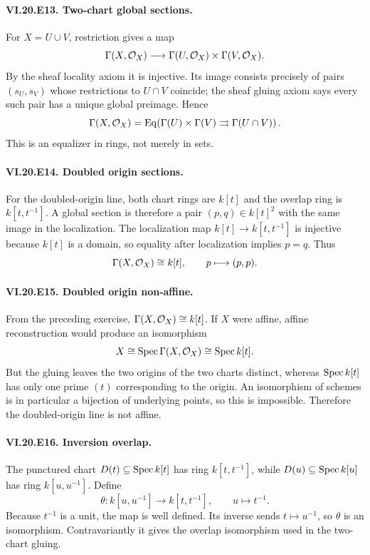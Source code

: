 \paragraph{VI.20.E13. Two-chart global sections.}
\begin{solution}
For $X=U\cup V$, restriction gives a map
\[
\Gamma(X,\mathcal O_X)\longrightarrow \Gamma(U,\mathcal O_X)\times\Gamma(V,\mathcal O_X).
\]
By the sheaf locality axiom it is injective.  Its image consists precisely of pairs $(s_U,s_V)$ whose restrictions to $U\cap V$ coincide; the sheaf gluing axiom says every such pair has a unique global preimage.  Hence
\[
\Gamma(X,\mathcal O_X)
=\operatorname{Eq}\!\left(
\Gamma(U)\times\Gamma(V)\rightrightarrows\Gamma(U\cap V)
\right).
\]
This is an equalizer in rings, not merely in sets.
\end{solution}

\paragraph{VI.20.E14. Doubled origin sections.}
\begin{solution}
For the doubled-origin line, both chart rings are $k[t]$ and the overlap ring is $k[t,t^{-1}]$.  A global section is therefore a pair $(p,q)\in k[t]^2$ with the same image in the localization.  The localization map $k[t]\to k[t,t^{-1}]$ is injective because $k[t]$ is a domain, so equality after localization implies $p=q$.  Thus
\[
\Gamma(X,\mathcal O_X)\cong k[t],\qquad p\longmapsto(p,p).
\]
\end{solution}

\paragraph{VI.20.E15. Doubled origin non-affine.}
\begin{solution}
From the preceding exercise, $\Gamma(X,\mathcal O_X)\cong k[t]$.  If $X$ were affine, affine reconstruction would produce an isomorphism
\[
X\cong\operatorname{Spec}\Gamma(X,\mathcal O_X)\cong\operatorname{Spec} k[t].
\]
But the gluing leaves the two origins of the two charts distinct, whereas $\operatorname{Spec} k[t]$ has only one prime $(t)$ corresponding to the origin.  An isomorphism of schemes is in particular a bijection of underlying points, so this is impossible.  Therefore the doubled-origin line is not affine.
\end{solution}

\paragraph{VI.20.E16. Inversion overlap.}
\begin{solution}
The punctured chart $D(t)\subseteq\operatorname{Spec} k[t]$ has ring $k[t,t^{-1}]$, while $D(u)\subseteq\operatorname{Spec} k[u]$ has ring $k[u,u^{-1}]$.  Define
\[
\theta:k[u,u^{-1}]\longrightarrow k[t,t^{-1}],\qquad u\longmapsto t^{-1}.
\]
Because $t^{-1}$ is a unit, the map is well defined.  Its inverse sends $t\mapsto u^{-1}$, so $\theta$ is an isomorphism.  Contravariantly it gives the overlap isomorphism used in the two-chart gluing.
\end{solution}

